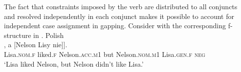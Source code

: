 \documentclass[output=paper]{../langscibook}
\begin{document}
The fact that constraints imposed by the verb are distributed to all
conjuncts and resolved independently in each conjunct makes it
possible to account for independent case assignment in gapping.
Consider  with the corresponding f-structure in .
\ea\label{ex:pat:prz:17:34}
  Polish\\\gll
    [[Lisa \tightuline{lubiła} Nelsona], a [Nelson Lisy nie]].\\
    \phtm{[[}Lisa.\textsc{nom.f} liked.\textsc{f} \phtm{[}Nelson.\textsc{acc.m1} but
    Nelson.\textsc{nom.m1} Lisa.\textsc{gen.f} \textsc{neg}\\
\glt  ‘Lisa liked Nelson, but Nelson didn't like Lisa.’\\ \hspace*{\fill} \citep[(34)]{PatejukPrzepiorkowski2017}
\z
{}
\end{document}
